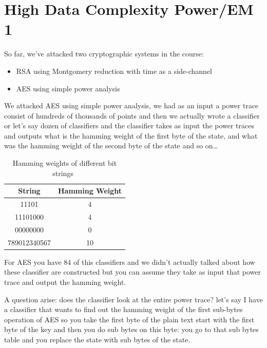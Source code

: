 \chapter{High Data Complexity Power/EM 1} \label{cha:High Data Complexity Power/EM 1}

So far, we've attacked two cryptographic systems in the course:
\begin{itemize}
    \item RSA using Montgomery reduction with time as a side-channel
    \item AES using simple power analysis
\end{itemize}

We attacked AES using simple power analysis, we had as an input a power trace
consist of hundreds of thousands of points and then we actually wrote a
classifier or let's say dozen of classifiers and the classifier takes as input
the power traces and outputs what is the hamming weight of the first byte of the
state, and what was the hamming weight of the second byte of the state and so
on\ldots

\begin{table}
    \caption{Hamming weights of different bit strings~\cite{hamming}}\label{hammingWeights}
    \begin{center}
    \begin{tabular}{ cc }
        \toprule
        String & Hamming Weight \\ 
        \midrule
        11101 & 4 \\ 
        11101000 & 4 \\
        00000000 & 0 \\
        789012340567 & 10 \\
        \bottomrule
    \end{tabular}
    \end{center}
\end{table}

For AES you have 84 of this classifiers and we didn't actually talked about how
these classifier are constructed but you can assume they take as input that
power trace and output the hamming weight. 

A question arise: does the classifier look at the entire power trace? let's say
I have a classifier that wants to find out the hamming weight of the first
sub-bytes operation of AES so you take the first byte of the plain text start
with the first byte of the key and then you do sub bytes on this byte: you go to
that sub bytes table and you replace the state with sub bytes of the state. 

